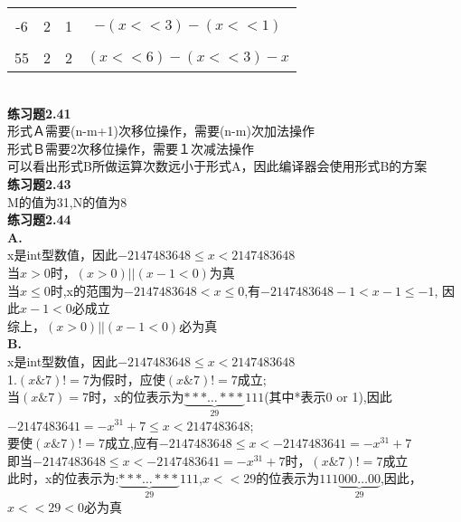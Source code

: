 \documentclass{article}
\begin{document}
\begin{CJK}{UTF8}{uyhei}
\begin{tabular}[t]{|c|c|c|c|}
	\hline		\\[-2ex]
	-6	&	2	&	1		&	$-(x<<3)-(x<<1)$	\\
	\hline		\\[-2ex]
	55	&	2	&	2		&	$(x<<6)-(x<<3)-x$	\\
	\hline
\end{tabular}	\\[3ex]
\textbf{练习题2.41}	\\[1ex]
形式Ａ需要(n-m+1)次移位操作，需要(n-m)次加法操作	\\
形式Ｂ需要2次移位操作，需要１次减法操作	\\
可以看出形式B所做运算次数远小于形式A，因此编译器会使用形式B的方案	\\[3ex]
\textbf{练习题2.43}		\\[1ex]
M的值为31,N的值为8	\\[3ex]
\textbf{练习题2.44}	\\[1ex]
\textbf{A.}	\\
x是int型数值，因此$-2147483648\le x< 2147483648$	\\
当$x>0$时，$(x>0)||(x-1<0)$为真	\\
当$x\le 0$时,x的范围为$-2147483648<x\le 0$,有$-2147483648-1<x-1\le -1$, 因此$x-1<0$必成立	\\
综上，$(x>0)||(x-1<0)$必为真	\\
\textbf{B.} 	\\[1ex]
x是int型数值，因此$-2147483648\le x< 2147483648$	\\
1.$(x\&7)!=7$为假时，应使$(x\&7)!=7$成立;	\\
当$(x\&7)=7$时，x的位表示为$\underbrace{***\dots***}_{29}111$(其中*表示0 or 1),因此$-2147483641=-x^{31}+7\le x< 2147483648$;	\\
要使$(x\&7)!=7$成立,应有$-2147483648\le x<-2147483641=-x^{31}+7$	\\
即当$-2147483648\le x<-2147483641=-x^{31}+7$时，$(x\&7)!=7$成立	\\
此时，x的位表示为:$\underbrace{***\dots***}_{29}111$,$x<<29$的位表示为$111\underbrace{000\dots00}_{29}$,因此，$x<<29<0$必为真








\end{CJK}
\end{document}
